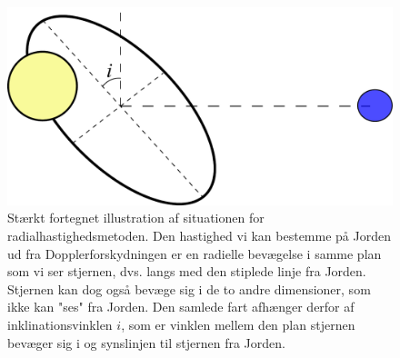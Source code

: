 \begin{figure}[h!]
    \centering
    \includegraphics[width=.7\textwidth]{Astrofysik/billeder/Inklinitionsvinkel.pdf}
    \caption{Stærkt fortegnet illustration af situationen for radialhastighedsmetoden. Den hastighed vi kan bestemme på Jorden ud fra Dopplerforskydningen er en radielle bevægelse i samme plan som vi ser stjernen, dvs. langs med den stiplede linje fra Jorden. Stjernen kan dog også bevæge sig i de to andre dimensioner, som ikke kan "ses" fra Jorden. Den samlede fart afhænger derfor af inklinationsvinklen $i$, som er vinklen mellem den plan stjernen bevæger sig i og synslinjen til stjernen fra Jorden.} %
    \label{fig:vsini}
\end{figure}

